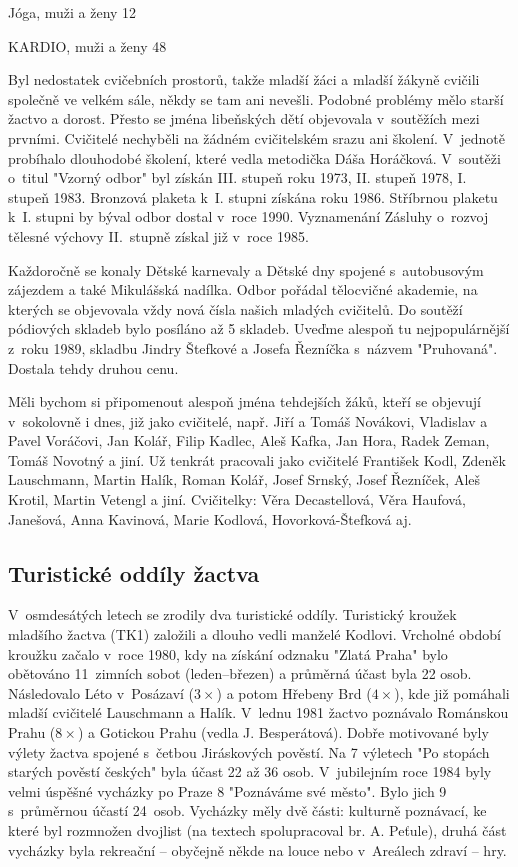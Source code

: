 \documentclass[a5paper, 11pt, twoside]{article}
\begin{document}
Jóga, muži a ženy 12

KARDIO, muži a ženy 48

\medskip

\noindent
Byl nedostatek cvičebních prostorů, takže mladší žáci a mladší žákyně
cvičili společně ve velkém sále, někdy se tam ani nevešli. Podobné
problémy mělo starší žactvo a dorost. Přesto se jména libeňských dětí
objevovala v~soutěžích mezi prvními. Cvičitelé nechyběli na žádném
cvičitelském srazu ani školení. V~jednotě probíhalo dlouhodobé školení,
které vedla metodička Dáša Horáčková. V~soutěži o~titul "Vzorný odbor"
byl získán III. stupeň roku 1973, II. stupeň 1978, I. stupeň 1983.
Bronzová plaketa k~I. stupni získána roku 1986. Stříbrnou plaketu k~I.
stupni by býval odbor dostal v~roce 1990. Vyznamenání Zásluhy o~rozvoj
tělesné výchovy II.~stupně získal již v~roce 1985.

Každoročně se konaly Dětské karnevaly a Dětské dny spojené s~autobusovým
zájezdem a také Mikulášská nadílka. Odbor pořádal tělocvičné akademie,
na kterých se objevovala vždy nová čísla našich mladých cvičitelů. Do
soutěží pódiových skladeb bylo posíláno až 5 skladeb. Uveďme alespoň tu
nejpopulárnější z~roku 1989, skladbu Jindry Štefkové a Josefa Řezníčka
s~názvem "Pruhovaná". Dostala tehdy druhou cenu.

Měli bychom si připomenout alespoň jména tehdejších žáků, kteří se
objevují v~sokolovně i dnes, již jako cvičitelé, např. Jiří a Tomáš
Novákovi, Vladislav a Pavel Voráčovi, Jan Kolář, Filip Kadlec, Aleš
Kafka, Jan Hora, Radek Zeman, Tomáš Novotný a jiní. Už tenkrát pracovali
jako cvičitelé František Kodl, Zdeněk Lauschmann, Martin Halík, Roman
Kolář, Josef Srnský, Josef Řezníček, Aleš Krotil, Martin Vetengl a jiní.
Cvičitelky: Věra Decastellová, Věra Haufová, Janešová, Anna Kavinová,
Marie Kodlová, Hovorková-Štefková aj.

\subsection{Turistické oddíly
žactva}

V~osmdesátých letech se zrodily dva turistické oddíly. Turistický
kroužek mladšího žactva (TK1) založili a dlouho vedli manželé Kodlovi.
Vrcholné období kroužku začalo v~roce 1980, kdy na získání odznaku
"Zlatá Praha" bylo obětováno 11~zimních sobot (leden--březen) a
průměrná účast byla 22 osob. Následovalo Léto v~Posázaví (\(3\times\)) a potom
Hřebeny Brd (\(4\times\)), kde již pomáhali mladší cvičitelé Lauschmann a Halík.
V~lednu 1981 žactvo poznávalo Románskou Prahu (\(8\times\)) a Gotickou Prahu
(vedla J. Besperátová). Dobře motivované byly výlety žactva spojené
s~četbou Jiráskových pověstí. Na 7 výletech "Po stopách starých pověstí
českých" byla účast 22 až 36 osob. V~jubilejním roce 1984 byly velmi
úspěšné vycházky po Praze 8 "Poznáváme své město". Bylo jich 9
s~průměrnou účastí 24~osob. Vycházky měly dvě části: kulturně poznávací,
ke které byl rozmnožen dvojlist (na textech spolupracoval br. A.
Peťule), druhá část vycházky byla rekreační -- obyčejně někde na louce
nebo v~Areálech zdraví -- hry.
\end{document}
